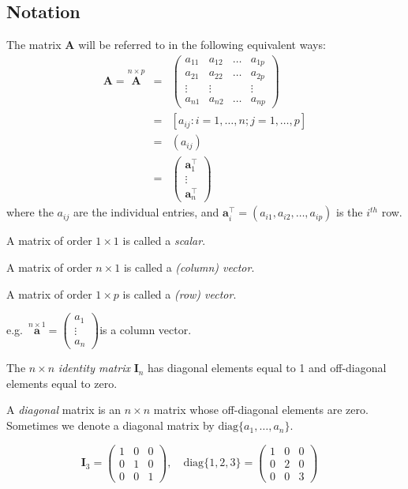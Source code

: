 \documentclass[
]{book}
\theoremstyle{definition}
\theoremstyle{definition}
\theoremstyle{definition}
\theoremstyle{definition}
\theoremstyle{remark}
\begin{document}
\hypertarget{notation-1}{%
\subsection{Notation}\label{notation-1}}

The matrix \({\mathbf A}\) will be referred to in the following equivalent ways:
\begin{eqnarray*}
{\mathbf A}=\stackrel{n\times p}{\mathbf A} &=& \left(\begin{array}{cccc}
a_{11}&a_{12}&\dots&a_{1p}\\
a_{21}&a_{22}&\dots&a_{2p}\\
\vdots&\vdots&&\vdots\\
a_{n1}&a_{n2}&\dots&a_{np}
\end{array} \right) \\
&=&[a_{ij}: i=1, \ldots , n; j=1, \ldots , p]\\
&=&(a_{ij})\\
&=& \left( \begin{array}{c}\mathbf a_1^\top\\
\vdots\\
\mathbf a_n^\top\end{array}\right)
\end{eqnarray*}
where the \(a_{ij}\) are the individual entries, and \(\mathbf a_i^\top=(a_{i1}, a_{i2}, \ldots, a_{ip})\) is the \(i^{th}\) row.

A matrix of order \(1\times 1\) is called a \emph{scalar}.

A matrix of order \(n\times 1\) is called a \emph{(column) vector}.

A matrix of order \(1\times p\) is called a \emph{(row) vector}.

e.g.~\(\stackrel{n\times 1}{\mathbf a}=\left( \begin{array}{c} a_1\\\vdots\\a_n \end{array} \right)\)\quad is a column vector.

The \(n\times n\) \emph{identity matrix} \({\mathbf I}_n\) has diagonal elements equal to 1
and off-diagonal elements equal to zero.

A \emph{diagonal} matrix is an \(n \times n\) matrix whose
off-diagonal elements are zero. Sometimes we denote a diagonal
matrix by \(\text{diag}\{a_1,\ldots, a_n\}\).

\[\mathbf I_3 = \left(\begin{array}{ccc} 1&0&0\\ 0&1&0\\ 0&0&1\end{array}\right),\quad \text{diag}\{1,2,3\}=\left(\begin{array}{ccc} 1&0&0\\ 0&2&0\\ 0&0&3\end{array}\right)\quad\]
\end{document}
